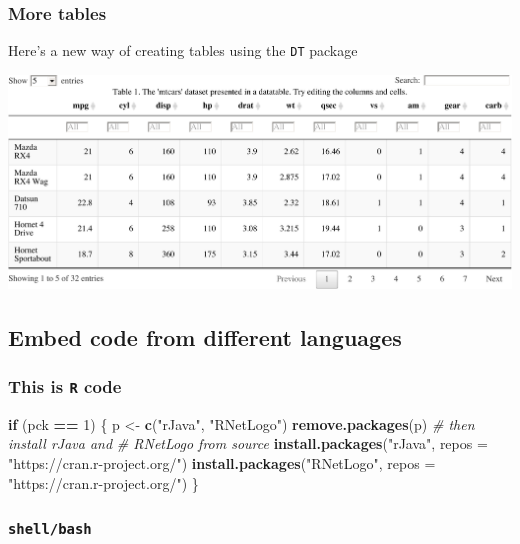 \documentclass[article]{article}
\newenvironment{Shaded}{\begin{snugshade}}{\end{snugshade}}
\newcommand{\KeywordTok}[1]{\textcolor[rgb]{0.13,0.29,0.53}{\textbf{#1}}}
\newcommand{\DataTypeTok}[1]{\textcolor[rgb]{0.13,0.29,0.53}{#1}}
\newcommand{\DecValTok}[1]{\textcolor[rgb]{0.00,0.00,0.81}{#1}}
\newcommand{\StringTok}[1]{\textcolor[rgb]{0.31,0.60,0.02}{#1}}
\newcommand{\CommentTok}[1]{\textcolor[rgb]{0.56,0.35,0.01}{\textit{#1}}}
\newcommand{\ControlFlowTok}[1]{\textcolor[rgb]{0.13,0.29,0.53}{\textbf{#1}}}
\newcommand{\OperatorTok}[1]{\textcolor[rgb]{0.81,0.36,0.00}{\textbf{#1}}}
\newcommand{\NormalTok}[1]{#1}
\begin{document}
\subsubsection{More tables}\label{more-tables}

Here's a new way of creating tables using the \texttt{DT} package

\includegraphics{Lesson5_rmd_files/figure-latex/unnamed-chunk-4-1.pdf}

\subsection{Embed code from different
languages}\label{embed-code-from-different-languages}

\subsubsection{\texorpdfstring{This is \texttt{R}
code}{This is R code}}\label{this-is-r-code}

\begin{Shaded}
\begin{Highlighting}[]
\ControlFlowTok{if}\NormalTok{ (pck }\OperatorTok{==}\StringTok{ }\DecValTok{1}\NormalTok{) \{}
\NormalTok{    p <-}\StringTok{ }\KeywordTok{c}\NormalTok{(}\StringTok{"rJava"}\NormalTok{, }\StringTok{"RNetLogo"}\NormalTok{)}
    \KeywordTok{remove.packages}\NormalTok{(p)}
    \CommentTok{# then install rJava and}
    \CommentTok{# RNetLogo from source}
    \KeywordTok{install.packages}\NormalTok{(}\StringTok{"rJava"}\NormalTok{, }
        \DataTypeTok{repos =} \StringTok{"https://cran.r-project.org/"}\NormalTok{)}
    \KeywordTok{install.packages}\NormalTok{(}\StringTok{"RNetLogo"}\NormalTok{, }
        \DataTypeTok{repos =} \StringTok{"https://cran.r-project.org/"}\NormalTok{)}
\NormalTok{\}}
\end{Highlighting}
\end{Shaded}

\subsubsection{\texorpdfstring{\texttt{shell/bash}}{shell/bash}}\label{shellbash}
\end{document}
